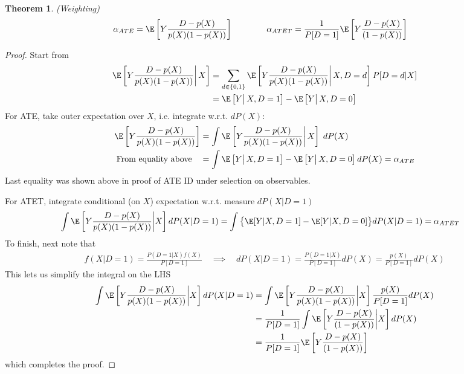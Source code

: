 \documentclass[12pt]{article}
\theoremstyle{plain}
\newtheorem{thm}{Theorem}[section]
\theoremstyle{definition}
\theoremstyle{remark}
\begin{document}
\begin{thm}
\emph{(Weighting)}
\begin{align*}
  \alpha_{ATE}
  &=
  \E\left[
    Y
    \frac{D-p(X)}{p(X)(1-p(X))}
  \right]
  \qquad
  \qquad
  \alpha_{ATET}
  =
  \frac{1}{P[D=1]}
  \E\left[
    Y
    \frac{D-p(X)}{(1-p(X))}
  \right]
\end{align*}
\end{thm}
\begin{proof}
Start from
\begin{align*}
  \E\left[
    Y
    \frac{D-p(X)}{p(X)(1-p(X))}
    \bigg|
    \,X
  \right]
  &=
  \sum_{d\in \{0,1\}}
  \E\left[
    Y
    \frac{D-p(X)}{p(X)(1-p(X))}
    \bigg|
    \,X,D=d
  \right]
  P[D=d|X]
  \\
  &=
  \E\left[
    Y
    \big|
    \,X,D=1
  \right]
  -
  \E\left[
    Y
    \big|
    \,X,D=0
  \right]
\end{align*}
For ATE, take outer expectation over $X$, i.e. integrate w.r.t.
$dP(X)$:
\begin{align*}
  \E\left[
    Y
    \frac{D-p(X)}{p(X)(1-p(X))}
  \right]
  &=
  \int
  \E\left[
    Y
    \frac{D-p(X)}{p(X)(1-p(X))}
    \bigg|
    \,X
  \right]
  \;dP(X)
  \\
  \text{From equality above}
  \quad
  &=
  \int
  \E\left[
    Y
    \big|
    \,X,D=1
  \right]
  -
  \E\left[
    Y
    \big|
    \,X,D=0
  \right]
  dP(X)
  =
  \alpha_{ATE}
\end{align*}
Last equality was shown above in proof of ATE ID under selection on
observables.

For ATET, integrate conditional (on $X$) expectation w.r.t.
measure $dP(X|D=1)$
\begin{align*}
  \int
  \E\left[
    Y
    \frac{D-p(X)}{p(X)(1-p(X))}
    \bigg|
    X
  \right]
  dP(X|D=1)
  &=
  \int
  \big\{
  \E[
    Y
    |
    X,D=1
  ]
  -
  \E[
    Y
    |
    X,D=0
  ]
  \big\}
  dP(X|D=1)
  =
  \alpha_{ATET}
\end{align*}
To finish, next note that
\begin{align*}
  f(X|D=1)
  =
  \frac{P(D=1|X)f(X)}{P[D=1]}
  \quad\implies\quad
  dP(X|D=1)
  =
  \frac{P(D=1|X)}{P[D=1]}
  dP(X)
  =
  \frac{p(X)}{P[D=1]}
  dP(X)
\end{align*}
This lets us simplify the integral on the LHS
\begin{align*}
  \int
  \E\left[
    Y
    \frac{D-p(X)}{p(X)(1-p(X))}
    \bigg|
    X
  \right]
  dP(X|D=1)
  &=
  \int
  \E\left[
    Y
    \frac{D-p(X)}{p(X)(1-p(X))}
    \bigg|
    X
  \right]
  \frac{p(X)}{P[D=1]}
  dP(X)
  \\
  &=
  \frac{1}{P[D=1]}
  \int
  \E\left[
    Y
    \frac{D-p(X)}{(1-p(X))}
    \bigg|
    X
  \right]
  dP(X)
  \\
  &=
  \frac{1}{P[D=1]}
  \E\left[
    Y
    \frac{D-p(X)}{(1-p(X))}
  \right]
\end{align*}
which completes the proof.
\end{proof}
\end{document}

